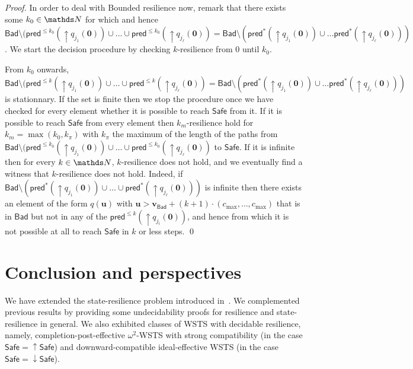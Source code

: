 \documentclass[runningheads]{llncs}
\newcommand{\pred}{\textsf{pred}}
\newcommand{\Bad}{\textsf{Bad}}
\newcommand{\Safe}{\textsf{Safe}}
\begin{document}
\begin{proof}
In order to deal with {\sc Bounded resilience} now, remark that there exists some $k_0 \in \N$ for which
and hence
$\Bad \setminus (\pred^{\leq k_0}(\uparrow q_{j_1}(\textbf{0}))\cup \ldots \cup \pred^{\leq k_0}(\uparrow q_{j_\ell}(\textbf{0}))= 
\Bad \setminus (\pred^{*}(\uparrow q_{j_1}(\textbf{0})) \cup \ldots \pred^{*}(\uparrow q_{j_\ell}(\textbf{0})) )$.
We start the decision procedure by checking {\sc $k$-resilience} from $0$ until $k_0$.

From $k_0$ onwards,
$\Bad \setminus (\pred^{\leq k}(\uparrow q_{j_1}(\textbf{0}))\cup \ldots \cup \pred^{\leq k}(\uparrow q_{j_\ell}(\textbf{0}))= 
\Bad \setminus (\pred^{*}(\uparrow q_{j_1}(\textbf{0})) \cup \ldots \pred^{*}(\uparrow q_{j_\ell}(\textbf{0})) )$
is stationnary. 
If the set is finite then we stop the procedure once we have checked for every element
whether it is possible to reach $\Safe$ from it.
If it is possible to reach $\Safe$ from every element then {\sc $k_m$-resilience}
hold
for $k_m = \max(k_0, k_{\pi})$ with 
$k_{\pi}$ the maximum of the length of the paths from 
$\Bad \setminus (\pred^{\leq k_0}(\uparrow q_{j_1}(\textbf{0}))\cup \ldots \cup \pred^{\leq k_0}(\uparrow q_{j_\ell}(\textbf{0}))$ to $\Safe$.
If it is infinite then
for every $k \in \N$,
$k$-resilience does not hold, 
and we eventually find a witness that $k$-resilience does not hold.
Indeed, 
if
$\Bad \setminus (\pred^{*}(\uparrow q_{j_1}(\textbf{0})) \cup \ldots \cup \pred^{*}(\uparrow q_{j_\ell}(\textbf{0})) )$
is
infinite
then
there exists an element of the form $q(\textbf{u} )$
with $\textbf{u} > \textbf{v}_{\Bad} + (k+1) \cdot (c_{\max}, \ldots, c_{\max})$ 
that is in $\Bad$ but not in any of the $\pred^{\leq k}(\uparrow q_{j_i}(\textbf{0}))$,
and hence from which it is not possible at all to reach
$\Safe$ in $k$ or less steps.
\qed
\end{proof}









\section{Conclusion and perspectives}


We have extended the state-resilience problem introduced in~\cite{DBLP:journals/corr/PrasadZ16,DBLP:journals/corr/abs-2108-00889,DBLP:conf/gg/Ozkan22}.
We complemented previous results by providing some undecidability proofs for resilience and state-resilience in general. We also exhibited classes of WSTS with decidable resilience, namely, 
completion-post-effective $\omega^2$-WSTS with strong compatibility (in the case 
 $\Safe = \uparrow \Safe$) and 
downward-compatible
ideal-effective WSTS
(in the case 
 $\Safe = \downarrow \Safe$).
\end{document}
